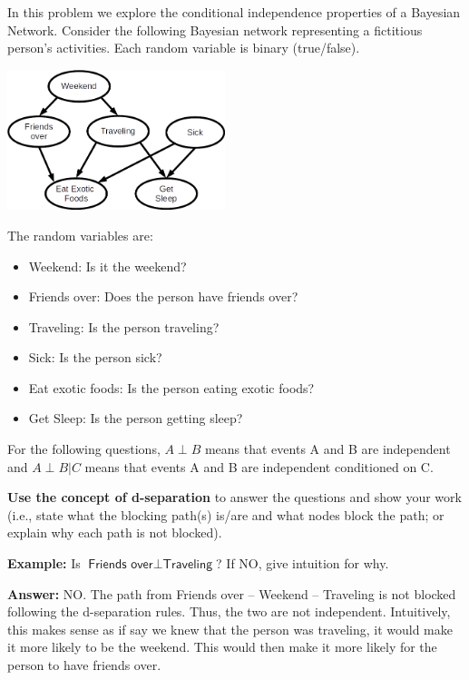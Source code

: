 \documentclass[submit]{harvardml}
\newcommand{\attr}[1]{\textsf{#1}}
\begin{document}
\begin{problem}

  \noindent In this problem we explore the conditional independence
  properties of a Bayesian Network.  Consider the following Bayesian
  network representing a fictitious person's activities. Each random
  variable is binary (true/false).

\begin{center}
\includegraphics[width=2.5in]{bn.png}
\end{center}

The random variables are:

\begin{itemize}
\item \attr{Weekend}: Is it the weekend?
\item \attr{Friends over}: Does the person have friends over?
\item \attr{Traveling}: Is the person traveling?
\item \attr{Sick}: Is the person sick?
\item \attr{Eat exotic foods}: Is the person eating exotic foods?
\item \attr{Get Sleep}: Is the person getting sleep?
\end{itemize}

\medskip

For the following questions, $A \perp B$ means that events A and B are
independent and $A \perp B | C$ means that events A and B are independent
conditioned on C.

\textbf{Use the concept of d-separation} to answer the
questions and show your work (i.e., state what the blocking path(s) is/are and what nodes block the path; or explain why each path is not blocked).

\textbf{Example:} Is $\attr{Friends over} \perp \attr{Traveling}$? If NO, give intuition for why.

\textbf{Answer:} NO. The path from Friends over -- Weekend -- Traveling is not blocked following the d-separation rules. Thus, the two are not independent. Intuitively, this makes sense as if say we knew that the person was traveling, it would make it more likely to be the weekend. This would then make it more likely for the person to have friends over. 


\end{problem}
\end{document}
